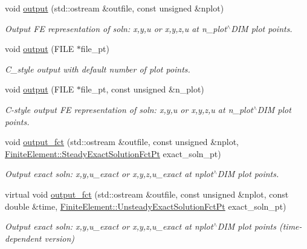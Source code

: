 \begin{DoxyCompactItemize}
void \hyperlink{classoomph_1_1WomersleyEquations_acf07411d652b5c2fc16d5dc309eb6ffc}{output} (std\+::ostream \&outfile, const unsigned \&nplot)
\begin{DoxyCompactList}\small\item\em Output FE representation of soln\+: x,y,u or x,y,z,u at n\+\_\+plot$^\wedge$\+D\+IM plot points. \end{DoxyCompactList}\item 
void \hyperlink{classoomph_1_1WomersleyEquations_ab317caeb41aefe218596c1ff1c39d40f}{output} (F\+I\+LE $\ast$file\+\_\+pt)
\begin{DoxyCompactList}\small\item\em C\+\_\+style output with default number of plot points. \end{DoxyCompactList}\item 
void \hyperlink{classoomph_1_1WomersleyEquations_ad5254560613d0c22280f15cc9cb42dc7}{output} (F\+I\+LE $\ast$file\+\_\+pt, const unsigned \&n\+\_\+plot)
\begin{DoxyCompactList}\small\item\em C-\/style output FE representation of soln\+: x,y,u or x,y,z,u at n\+\_\+plot$^\wedge$\+D\+IM plot points. \end{DoxyCompactList}\item 
void \hyperlink{classoomph_1_1WomersleyEquations_aebc178cae7a5f50da1f76eed2ea3972d}{output\+\_\+fct} (std\+::ostream \&outfile, const unsigned \&nplot, \hyperlink{classoomph_1_1FiniteElement_a690fd33af26cc3e84f39bba6d5a85202}{Finite\+Element\+::\+Steady\+Exact\+Solution\+Fct\+Pt} exact\+\_\+soln\+\_\+pt)
\begin{DoxyCompactList}\small\item\em Output exact soln\+: x,y,u\+\_\+exact or x,y,z,u\+\_\+exact at nplot$^\wedge$\+D\+IM plot points. \end{DoxyCompactList}\item 
virtual void \hyperlink{classoomph_1_1WomersleyEquations_ab1468b769eeb97f0a603526531e01564}{output\+\_\+fct} (std\+::ostream \&outfile, const unsigned \&nplot, const double \&time, \hyperlink{classoomph_1_1FiniteElement_ad4ecf2b61b158a4b4d351a60d23c633e}{Finite\+Element\+::\+Unsteady\+Exact\+Solution\+Fct\+Pt} exact\+\_\+soln\+\_\+pt)
\begin{DoxyCompactList}\small\item\em Output exact soln\+: x,y,u\+\_\+exact or x,y,z,u\+\_\+exact at nplot$^\wedge$\+D\+IM plot points (time-\/dependent version) \end{DoxyCompactList}\item 

\end{DoxyCompactItemize}
